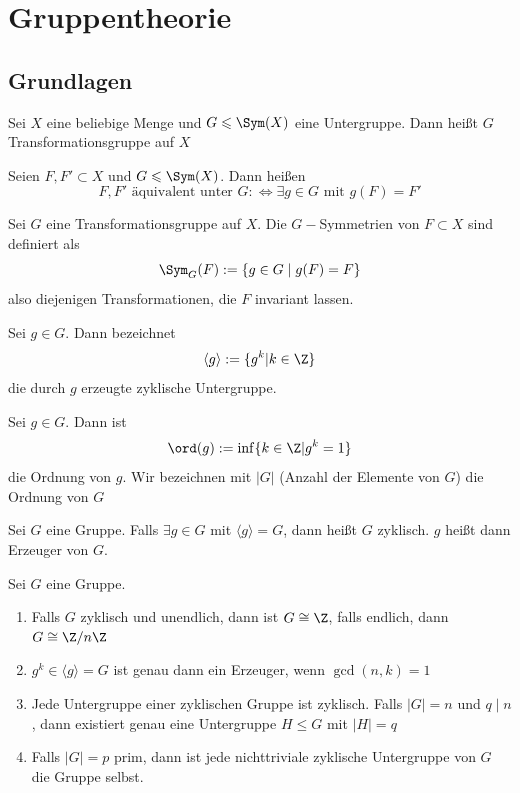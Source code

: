 \documentclass[11pt, a4paper]{article}
\begin{document}
\newpage
\section{Gruppentheorie}
\subsection{Grundlagen}
\begin{definition}[Transformationsgruppe]
    Sei $X$ eine beliebige Menge und $G \leqslant\Sym(X)$ eine Untergruppe. Dann heißt $G$ Transformationsgruppe auf $X$
\end{definition}

\begin{definition}
    Seien $F,F'\subset X$ und $G\leqslant \Sym(X)$. Dann heißen
    $$F,F' \text{ äquivalent unter $G$} :\Longleftrightarrow \exists g\in G \text{ mit } g(F) = F'$$
\end{definition}

\begin{definition}[G-Symmetrien]
Sei $G$ eine Transformationsgruppe auf $X$. Die $G-$Symmetrien von $F\subset X$ sind definiert als
$$\Sym_G(F):= \{g\in G \; | \; g(F) = F\}$$
also diejenigen Transformationen, die $F$ invariant lassen.
\end{definition}

\begin{definition}
Sei $g\in G$. Dann bezeichnet
$$\langle g \rangle := \{g^k | k \in \Z\}$$
die durch $g$ erzeugte zyklische Untergruppe.
    
\end{definition}

\begin{definition}[Ordnung]
    Sei $g\in G$. Dann ist 
    $$\ord(g):= \inf\{k\in \Z | g^k = 1 \}$$
    die Ordnung von $g$. Wir bezeichnen mit $|G|$ (Anzahl der Elemente von $G$) die Ordnung von $G$ 
\end{definition}

\begin{definition}
Sei $G$ eine Gruppe. Falls $\exists g\in G$ mit $\langle g \rangle = G$, dann heißt $G$ zyklisch. $g$ heißt dann Erzeuger von $G$.
    
\end{definition}

\begin{lemma}
Sei $G$ eine Gruppe. 
\begin{enumerate}
    \item Falls $G$ zyklisch und unendlich, dann ist $G\cong \Z$, falls endlich, dann $G\cong \Z/n\Z$
    \item $g^k\in \langle g\rangle = G$ ist genau dann ein Erzeuger, wenn $\gcd(n,k)=1$
    \item Jede Untergruppe einer zyklischen Gruppe ist zyklisch. Falls $|G|=n$ und $q\mid n$, dann existiert genau eine Untergruppe $H\leqslant G$ mit $|H|=q$
    \item Falls $|G|=p$ prim, dann ist jede nichttriviale zyklische Untergruppe von $G$ die Gruppe selbst.
\end{enumerate}
\end{lemma}
\end{document}
